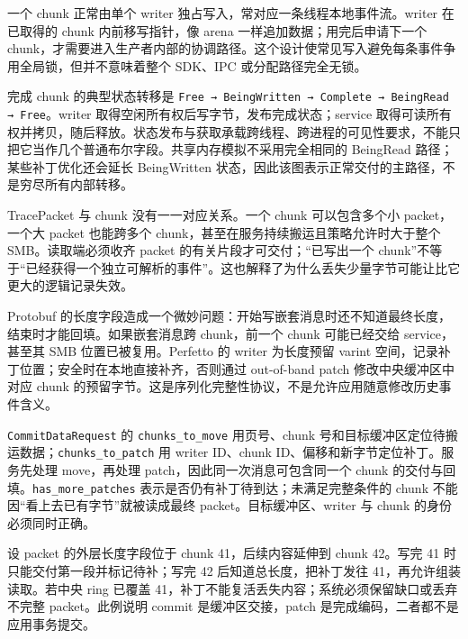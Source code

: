 \documentclass[UTF8,fontset=fandol,openany,11pt]{ctexbook}
\begin{document}
一个 chunk 正常由单个 writer 独占写入，常对应一条线程本地事件流。writer 在已取得的 chunk 内前移写指针，像 arena 一样追加数据；用完后申请下一个 chunk，才需要进入生产者内部的协调路径。这个设计使常见写入避免每条事件争用全局锁，但并不意味着整个 SDK、IPC 或分配路径完全无锁。\cite{pf-shmem}\cite{pf-arbiter}\cite{pf-writer}


完成 chunk 的典型状态转移是 \texttt{Free → BeingWritten → Complete → BeingRead → Free}。writer 取得空闲所有权后写字节，发布完成状态；service 取得可读所有权并拷贝，随后释放。状态发布与获取承载跨线程、跨进程的可见性要求，不能只把它当作几个普通布尔字段。共享内存模拟不采用完全相同的 BeingRead 路径；某些补丁优化还会延长 BeingWritten 状态，因此该图表示正常交付的主路径，不是穷尽所有内部转移。\cite{pf-shmem}\cite{pf-arbiter}


TracePacket 与 chunk 没有一一对应关系。一个 chunk 可以包含多个小 packet，一个大 packet 也能跨多个 chunk，甚至在服务持续搬运且策略允许时大于整个 SMB。读取端必须收齐 packet 的有关片段才可交付；“已写出一个 chunk”不等于“已经获得一个独立可解析的事件”。这也解释了为什么丢失少量字节可能让比它更大的逻辑记录失效。\cite{pf-buffer-v1}\cite{pf-writer}


Protobuf 的长度字段造成一个微妙问题：开始写嵌套消息时还不知道最终长度，结束时才能回填。如果嵌套消息跨 chunk，前一个 chunk 可能已经交给 service，甚至其 SMB 位置已被复用。Perfetto 的 writer 为长度预留 varint 空间，记录补丁位置；安全时在本地直接补齐，否则通过 out-of-band patch 修改中央缓冲区中对应 chunk 的预留字节。这是序列化完整性协议，不是允许应用随意修改历史事件含义。\cite{pf-writer}\cite{pf-commit}


\texttt{CommitDataRequest} 的 \texttt{chunks\_\allowbreak{}to\_\allowbreak{}move} 用页号、chunk 号和目标缓冲区定位待搬运数据；\texttt{chunks\_\allowbreak{}to\_\allowbreak{}patch} 用 writer ID、chunk ID、偏移和新字节定位补丁。服务先处理 move，再处理 patch，因此同一次消息可包含同一个 chunk 的交付与回填。\texttt{has\_\allowbreak{}more\_\allowbreak{}patches} 表示是否仍有补丁待到达；未满足完整条件的 chunk 不能因“看上去已有字节”就被读成最终 packet。目标缓冲区、writer 与 chunk 的身份必须同时正确。\cite{pf-commit}\cite{pf-service-impl}


设 packet 的外层长度字段位于 chunk 41，后续内容延伸到 chunk 42。写完 41 时只能交付第一段并标记待补；写完 42 后知道总长度，把补丁发往 41，再允许组装读取。若中央 ring 已覆盖 41，补丁不能复活丢失内容；系统必须保留缺口或丢弃不完整 packet。此例说明 commit 是缓冲区交接，patch 是完成编码，二者都不是应用事务提交。\cite{pf-buffer-v1}\cite{pf-commit}
\end{document}
